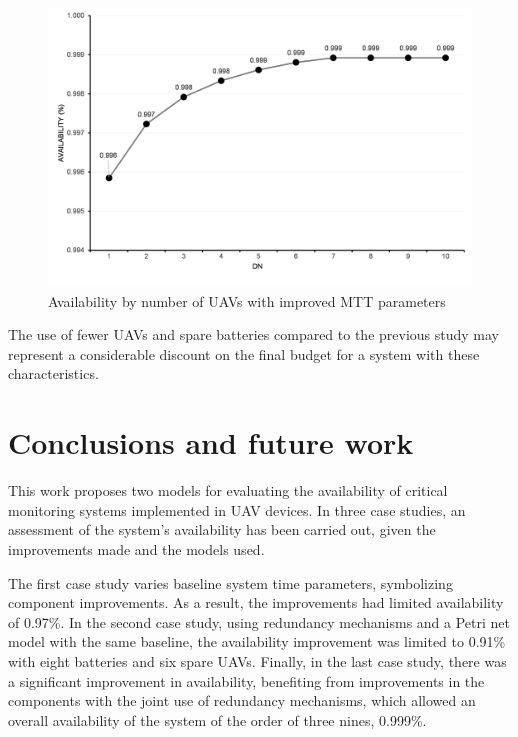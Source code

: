 \documentclass[conference]{IEEEtran}
\begin{document}
\begin{figure}[htbp]
\centerline{\includegraphics[scale=0.4]{img/exps/SA_004.png}}
\caption{Availability by number of UAVs with improved MTT parameters}
\label{fig:spn_sa_uav}
\end{figure}

The use of fewer UAVs and spare batteries compared to the previous study may represent a considerable discount on the final budget for a system with these characteristics.


\section{Conclusions and future work}
\label{sec:conclusions}

This work proposes two models for evaluating the availability of critical monitoring systems implemented in UAV devices. In three case studies, an assessment of the system's availability has been carried out, given the improvements made and the models used. 

The first case study varies baseline system time parameters, symbolizing component improvements. As a result, the improvements had limited availability of 0.97\%. In the second case study, using redundancy mechanisms and a Petri net model with the same baseline, the availability improvement was limited to 0.91\% with eight batteries and six spare UAVs. Finally, in the last case study, there was a significant improvement in availability, benefiting from improvements in the components with the joint use of redundancy mechanisms, which allowed an overall availability of the system of the order of three nines, 0.999\%.
\end{document}

